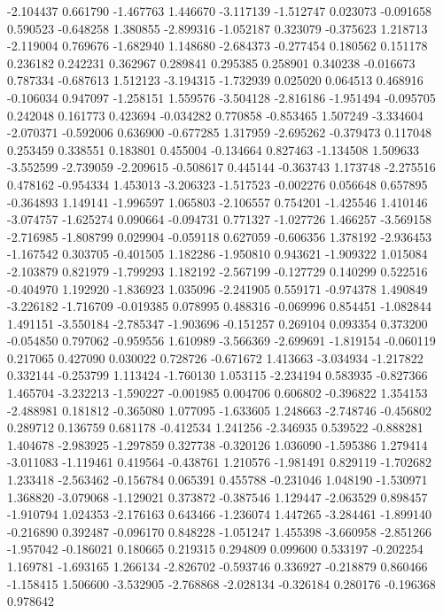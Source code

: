 -2.104437
0.661790
-1.467763
1.446670
-3.117139
-1.512747
0.023073
-0.091658
0.590523
-0.648258
1.380855
-2.899316
-1.052187
0.323079
-0.375623
1.218713
-2.119004
0.769676
-1.682940
1.148680
-2.684373
-0.277454
0.180562
0.151178
0.236182
0.242231
0.362967
0.289841
0.295385
0.258901
0.340238
-0.016673
0.787334
-0.687613
1.512123
-3.194315
-1.732939
0.025020
0.064513
0.468916
-0.106034
0.947097
-1.258151
1.559576
-3.504128
-2.816186
-1.951494
-0.095705
0.242048
0.161773
0.423694
-0.034282
0.770858
-0.853465
1.507249
-3.334604
-2.070371
-0.592006
0.636900
-0.677285
1.317959
-2.695262
-0.379473
0.117048
0.253459
0.338551
0.183801
0.455004
-0.134664
0.827463
-1.134508
1.509633
-3.552599
-2.739059
-2.209615
-0.508617
0.445144
-0.363743
1.173748
-2.275516
0.478162
-0.954334
1.453013
-3.206323
-1.517523
-0.002276
0.056648
0.657895
-0.364893
1.149141
-1.996597
1.065803
-2.106557
0.754201
-1.425546
1.410146
-3.074757
-1.625274
0.090664
-0.094731
0.771327
-1.027726
1.466257
-3.569158
-2.716985
-1.808799
0.029904
-0.059118
0.627059
-0.606356
1.378192
-2.936453
-1.167542
0.303705
-0.401505
1.182286
-1.950810
0.943621
-1.909322
1.015084
-2.103879
0.821979
-1.799293
1.182192
-2.567199
-0.127729
0.140299
0.522516
-0.404970
1.192920
-1.836923
1.035096
-2.241905
0.559171
-0.974378
1.490849
-3.226182
-1.716709
-0.019385
0.078995
0.488316
-0.069996
0.854451
-1.082844
1.491151
-3.550184
-2.785347
-1.903696
-0.151257
0.269104
0.093354
0.373200
-0.054850
0.797062
-0.959556
1.610989
-3.566369
-2.699691
-1.819154
-0.060119
0.217065
0.427090
0.030022
0.728726
-0.671672
1.413663
-3.034934
-1.217822
0.332144
-0.253799
1.113424
-1.760130
1.053115
-2.234194
0.583935
-0.827366
1.465704
-3.232213
-1.590227
-0.001985
0.004706
0.606802
-0.396822
1.354153
-2.488981
0.181812
-0.365080
1.077095
-1.633605
1.248663
-2.748746
-0.456802
0.289712
0.136759
0.681178
-0.412534
1.241256
-2.346935
0.539522
-0.888281
1.404678
-2.983925
-1.297859
0.327738
-0.320126
1.036090
-1.595386
1.279414
-3.011083
-1.119461
0.419564
-0.438761
1.210576
-1.981491
0.829119
-1.702682
1.233418
-2.563462
-0.156784
0.065391
0.455788
-0.231046
1.048190
-1.530971
1.368820
-3.079068
-1.129021
0.373872
-0.387546
1.129447
-2.063529
0.898457
-1.910794
1.024353
-2.176163
0.643466
-1.236074
1.447265
-3.284461
-1.899140
-0.216890
0.392487
-0.096170
0.848228
-1.051247
1.455398
-3.660958
-2.851266
-1.957042
-0.186021
0.180665
0.219315
0.294809
0.099600
0.533197
-0.202254
1.169781
-1.693165
1.266134
-2.826702
-0.593746
0.336927
-0.218879
0.860466
-1.158415
1.506600
-3.532905
-2.768868
-2.028134
-0.326184
0.280176
-0.196368
0.978642
